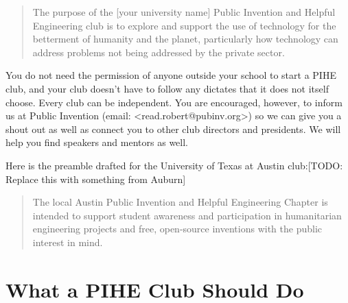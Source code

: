 \documentclass[
	fontsize=10pt, %
	twoside=false, %
	secnumdepth=1, %
]{kaobook}
\begin{document}
\blockquote{
The purpose of the [your university name] Public Invention and Helpful Engineering club is to explore and support the use of technology for the betterment of humanity and the planet, particularly how technology can address problems not being addressed by the private sector.
}

You do not need the permission of anyone outside your school to start a PIHE club, and your club doesn’t have to follow any dictates that it does not itself choose. Every club can be independent. You are encouraged, however, to inform us at Public Invention (email: <read.robert@pubinv.org>)  so we can give you a shout out as well as connect you to other club directors and presidents. We will help you find speakers and mentors as well.

Here is the preamble drafted for the University of Texas at Austin club:[TODO: Replace this with something from Auburn]
\blockquote{
The local Austin Public Invention and Helpful Engineering Chapter is intended to support student awareness and participation in humanitarian engineering projects and free, open-source inventions with the public interest in mind.
}

\section{What a PIHE Club Should Do}
\end{document}

